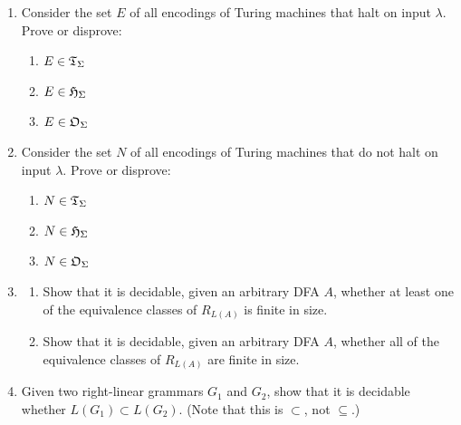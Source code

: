 \begin{enumerate}[{12.}1.]
\item Consider the set $E$ of all encodings of Turing machines that halt on
input $\lambda$. Prove or disprove:
\begin{enumerate}
\item $E\in\mathfrak{T}_\Sigma$
\item $E\in\mathfrak{H}_\Sigma$
\item $E\in\mathfrak{O}_\Sigma$
\end{enumerate}

\item Consider the set $N$ of all encodings of Turing machines that do not halt
on input $\lambda$. Prove or disprove:
\begin{enumerate}
\item $N\in\mathfrak{T}_\Sigma$
\item $N\in\mathfrak{H}_\Sigma$
\item $N\in\mathfrak{O}_\Sigma$
\end{enumerate}

\item 
\begin{enumerate}
\item
Show that it is decidable, given an arbitrary DFA $A$,
whether at least one of the equivalence classes of $R_{L(A)}$ is finite in size.
\item
Show that it is decidable, given an arbitrary DFA $A$,
whether all of the equivalence classes of $R_{L(A)}$ are finite in size.
\end{enumerate}

\item
Given two right-linear grammars $G_1$ and $G_2$,
show that it is decidable whether
$L(G_1) \subset L(G_2)$.
(Note that this is $\subset$, not $\subseteq$.)

\end{enumerate}
